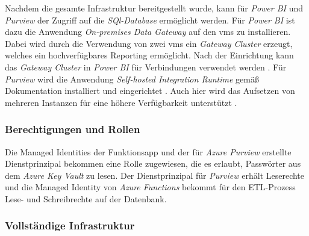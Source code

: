 Nachdem die gesamte Infrastruktur bereitgestellt wurde, kann für \textit{Power BI} und \textit{Purview} der Zugriff auf die \textit{SQl-Database} ermöglicht werden. Für \textit{Power BI} ist dazu die Anwendung \textit{On-premises Data Gateway} auf den \acp{vm} zu installieren. Dabei wird durch die Verwendung von zwei \acp{vm} ein \textit{Gateway Cluster} erzeugt, welches ein hochverfügbares Reporting ermöglicht. Nach der Einrichtung kann das \textit{Gateway Cluster} in \textit{Power BI} für Verbindungen verwendet werden \cite[vgl.][]{gunnarsson_pro_2020}. Für \textit{Purview} wird die Anwendung \textit{Self-hosted Integration Runtime} gemäß Dokumentation installiert und eingerichtet \cite[vgl.][]{msdoc_22_purviewSHIR}. Auch hier wird das Aufsetzen von mehreren Instanzen für eine höhere Verfügbarkeit unterstützt \cite{msdoc_22_purviewSHIRHighAv}. 


\subsubsection{Berechtigungen und Rollen} \label{subsec:infra:konfig:aad}
Die Managed Identities der Funktionsapp und der für \textit{Azure Purview} erstellte Dienstprinzipal bekommen eine Rolle zugewiesen, die es erlaubt, Passwörter aus dem \textit{Azure Key Vault} zu lesen. Der Dienstprinzipal für \textit{Purview} erhält Leserechte und
die Managed Identity von \textit{Azure Functions} bekommt für den ETL-Prozess Lese- und Schreibrechte auf der Datenbank.

\subsubsection{Vollständige Infrastruktur} \label{subsec:infra:konfig:VollständigeInfrastruktur}